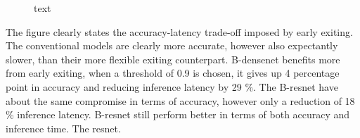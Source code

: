 \begin{figure}
	\caption[short text]{text}
\end{figure}

The figure clearly states the accuracy-latency trade-off imposed by early exiting. The conventional models are clearly more accurate, however also expectantly slower, than their more flexible exiting counterpart. B-\gls{densenet} benefits more from early exiting, when a threshold of 0.9 is chosen, it gives up 4 percentage point in accuracy and reducing inference latency by 29 \%. The B-\gls{resnet} have about the same compromise in terms of accuracy, however only a reduction of 18 \% inference latency. B-\gls{resnet} still perform better in terms of both accuracy and inference time. The \gls{resnet}. 

  \begin{figure}
	\captionsetup[subfigure]{justification=centering}
	\centering
	\caption[]{}
\end{figure}


